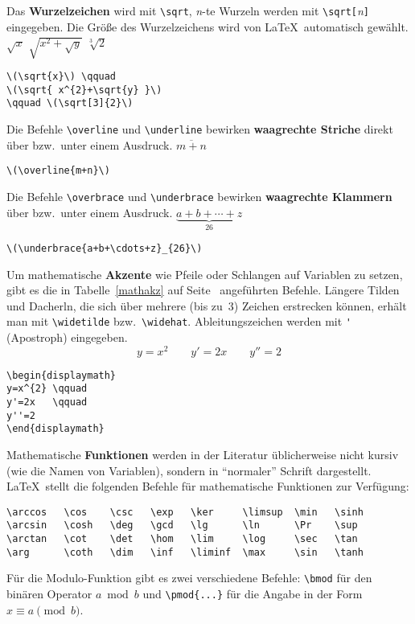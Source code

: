 Das \textbf{Wurzelzeichen} wird mit \verb|\sqrt|, \textit{n}-te
Wurzeln werden mit \verb|\sqrt[|\textit{n}\verb|]| eingegeben.
Die Größe des Wurzelzeichens wird von \LaTeX\ automatisch
gewählt.
\exa
\(\sqrt{x}\) \qquad
\(\sqrt{ x^{2}+\sqrt{y} }\)
\qquad \(\sqrt[3]{2}\)
\exb
\begin{verbatim}
\(\sqrt{x}\) \qquad
\(\sqrt{ x^{2}+\sqrt{y} }\)
\qquad \(\sqrt[3]{2}\)
\end{verbatim}
\exc
 
Die Befehle \verb|\overline| und \verb|\underline| bewirken
\textbf{waagrechte Striche} direkt über bzw.\ unter einem
Ausdruck.
\exa
\(\overline{m+n}\)
\exb
\begin{verbatim}
\(\overline{m+n}\)
\end{verbatim}
\exc
 
Die Befehle \verb|\overbrace| und \verb|\underbrace| bewirken
\textbf{waagrechte Klammern} über bzw.\ unter einem Ausdruck.
\exa
\(\underbrace{a+b+\cdots+z}_{26}\)
\exb
\begin{verbatim}
\(\underbrace{a+b+\cdots+z}_{26}\)
\end{verbatim}
\exc
 
Um mathematische \textbf{Akzente} wie Pfeile oder Schlangen auf
Variablen zu setzen, gibt es die in Tabelle~\ref{mathakz} auf
Seite~\pageref{mathakz} angeführten Befehle.
Längere Tilden und Dacherln, die sich über mehrere (bis zu~3)
Zeichen erstrecken können, erhält man mit \verb|\widetilde|
bzw.\ \verb|\widehat|.
Ableitungszeichen werden mit \verb|'| (Apostroph) eingegeben.
\exa
\begin{displaymath}
y=x^{2} \qquad
y'=2x   \qquad
y''=2
\end{displaymath}
\exb
\begin{verbatim}
\begin{displaymath}
y=x^{2} \qquad
y'=2x   \qquad
y''=2
\end{displaymath}
\end{verbatim}
\exc
 
Mathematische \textbf{Funktionen} werden in der Literatur
üblicherweise nicht kursiv (wie die Namen von Variablen),
sondern in "`normaler"' Schrift dargestellt.
\LaTeX\ stellt die folgenden Befehle für mathematische
Funktionen zur Verfügung:
\begin{verbatim}
\arccos   \cos    \csc   \exp   \ker     \limsup  \min   \sinh
\arcsin   \cosh   \deg   \gcd   \lg      \ln      \Pr    \sup
\arctan   \cot    \det   \hom   \lim     \log     \sec   \tan
\arg      \coth   \dim   \inf   \liminf  \max     \sin   \tanh
\end{verbatim}
Für die Modulo-Funktion gibt es zwei verschiedene Befehle:
\verb|\bmod| für den binären Operator \(a \bmod b\) und
\verb|\pmod{...}| für die Angabe in der Form \(x\equiv a
\pmod{b}\).
 
